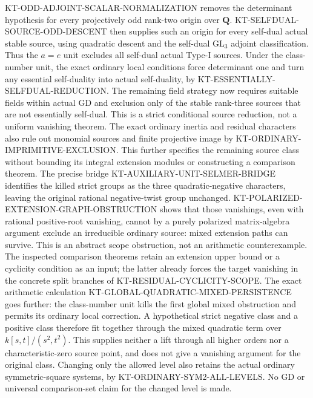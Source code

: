 KT-ODD-ADJOINT-SCALAR-NORMALIZATION removes the determinant
hypothesis for every projectively odd rank-two origin over
$\mathbf Q$. KT-SELFDUAL-SOURCE-ODD-DESCENT then supplies
such an origin for every self-dual actual stable source, using
quadratic descent and the self-dual $\mathrm{GL}_3$ adjoint
classification. Thus the $a=e$ unit excludes all self-dual
actual Type-I sources. Under the class-number unit, the exact
ordinary local conditions force determinant one and turn any
essential self-duality into actual self-duality, by
KT-ESSENTIALLY-SELFDUAL-REDUCTION.
The remaining field strategy now requires suitable fields
within actual GD and exclusion only of the stable rank-three
sources that are not essentially self-dual. This is a strict
conditional source reduction, not a uniform vanishing theorem.
The exact ordinary inertia and residual characters also rule
out monomial sources and finite projective image by
KT-ORDINARY-IMPRIMITIVE-EXCLUSION. This further specifies the
remaining source class without bounding its integral extension
modules or constructing a comparison theorem.
The precise bridge KT-AUXILIARY-UNIT-SELMER-BRIDGE identifies
the killed strict groups as the three quadratic-negative
characters, leaving the original rational negative-twist
group unchanged. KT-POLARIZED-EXTENSION-GRAPH-OBSTRUCTION
shows that those vanishings, even with rational positive-root
vanishing, cannot by a purely polarized matrix-algebra argument
exclude an irreducible ordinary source: mixed extension paths
can survive. This is an abstract scope obstruction, not an
arithmetic counterexample. The inspected comparison theorems
retain an extension upper bound or a cyclicity condition as an
input; the latter already forces the target vanishing in the
concrete split branches of KT-RESIDUAL-CYCLICITY-SCOPE.
The exact arithmetic calculation
KT-GLOBAL-QUADRATIC-MIXED-PERSISTENCE goes further:
the class-number unit kills the first global mixed obstruction
and permits its ordinary local correction. A hypothetical
strict negative class and a positive class therefore fit
together through the mixed quadratic term over
$k[s,t]/(s^2,t^2)$. This supplies neither a lift through all
higher orders nor a characteristic-zero source point, and
does not give a vanishing argument for the original class.
Changing only the allowed level also retains the actual
ordinary symmetric-square systems, by
KT-ORDINARY-SYM2-ALL-LEVELS. No GD or universal comparison-set
claim for the changed level is made.

